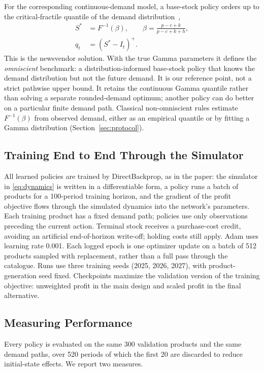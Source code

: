 \documentclass[conference]{IEEEtran}
\begin{document}
For the corresponding continuous-demand model, a base-stock policy orders up to the critical-fractile quantile of
the demand distribution~\cite{zipkin2000},
\begin{equation}
\begin{aligned}
S^* &= F^{-1}(\beta), \qquad \beta = \frac{p - c + k}{p - c + k + h},\\
q_t &= (S^* - I_t)^+.
\end{aligned}
\label{eq:newsvendor}
\end{equation}
This is the newsvendor solution. With the true Gamma parameters it defines the \emph{omniscient} benchmark: a
distribution-informed base-stock policy that knows the demand distribution but not the future demand. It is our
reference point, not a strict pathwise upper bound. It retains the continuous Gamma quantile rather than solving a
separate rounded-demand optimum; another policy can do better on a particular finite demand path.
Classical non-omniscient rules estimate $F^{-1}(\beta)$ from observed demand, either as an empirical quantile or by
fitting a Gamma distribution (Section~\ref{sec:protocol}).

\subsection{Training End to End Through the Simulator}\label{sec:training}
All learned policies are trained by DirectBackprop, as in the paper: the simulator in \eqref{eq:dynamics} is written
in a differentiable form, a policy runs a batch of products for a 100-period training horizon, and the gradient of the
profit objective flows through the simulated dynamics into the network's parameters. Each training product has a
fixed demand path; policies use only observations preceding the current action. Terminal stock receives a
purchase-cost credit, avoiding an artificial end-of-horizon write-off; holding costs still apply. Adam uses learning
rate 0.001. Each logged epoch is one optimizer update on a batch of 512 products sampled with replacement, rather
than a full pass through the catalogue. Runs use three training seeds (2025, 2026, 2027), with product-generation
seed fixed. Checkpoints maximize the validation version of the training objective: unweighted profit in the main
design and scaled profit in the final alternative.

\subsection{Measuring Performance}\label{sec:metrics}
Every policy is evaluated on the same 300 validation products and the same demand paths, over 520 periods of which
the first 20 are discarded to reduce initial-state effects. We report two measures.
\end{document}
